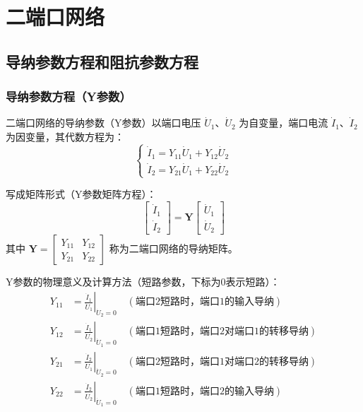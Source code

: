 \chapter{二端口网络}

\section{导纳参数方程和阻抗参数方程}

\subsection{导纳参数方程（Y参数）}
二端口网络的导纳参数（Y参数）以端口电压 $\dot{U}_1\text{、}\dot{U}_2$ 为自变量，端口电流 $\dot{I}_1\text{、}\dot{I}_2$ 为因变量，其代数方程为：
\[
\begin{cases} 
\dot{I}_1 = Y_{11}\dot{U}_1 + Y_{12}\dot{U}_2 \\ 
\dot{I}_2 = Y_{21}\dot{U}_1 + Y_{22}\dot{U}_2 
\end{cases}
\]

写成矩阵形式（Y参数矩阵方程）：
\[
\begin{bmatrix} 
\dot{I}_1 \\ 
\dot{I}_2 
\end{bmatrix} = 
\mathbf{Y}
\begin{bmatrix} 
\dot{U}_1 \\ 
\dot{U}_2 
\end{bmatrix}
\]
其中 $\mathbf{Y} = \begin{bmatrix} Y_{11} & Y_{12} \\ Y_{21} & Y_{22} \end{bmatrix}$ 称为二端口网络的导纳矩阵。

Y参数的物理意义及计算方法（短路参数，下标为0表示短路）：
\[
\begin{aligned}
Y_{11} &= \left. \frac{\dot{I}_1}{\dot{U}_1} \right|_{\dot{U}_2 = 0} \quad (\text{端口2短路时，端口1的输入导纳}) \\
Y_{12} &= \left. \frac{\dot{I}_1}{\dot{U}_2} \right|_{\dot{U}_1 = 0} \quad (\text{端口1短路时，端口2对端口1的转移导纳}) \\
Y_{21} &= \left. \frac{\dot{I}_2}{\dot{U}_1} \right|_{\dot{U}_2 = 0} \quad (\text{端口2短路时，端口1对端口2的转移导纳}) \\
Y_{22} &= \left. \frac{\dot{I}_2}{\dot{U}_2} \right|_{\dot{U}_1 = 0} \quad (\text{端口1短路时，端口2的输入导纳})
\end{aligned}
\]

